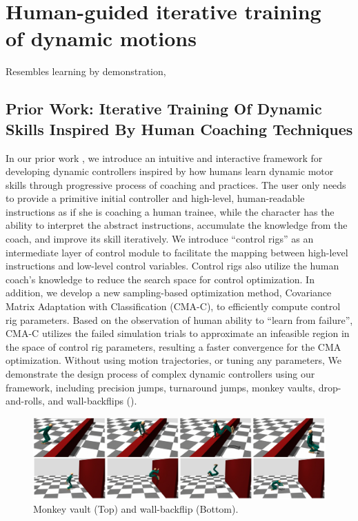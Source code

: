 \chapter{Human-guided iterative training \protect\\ of dynamic motions}
Resembles learning by demonstration,

\section{Prior Work: Iterative Training Of Dynamic Skills Inspired By Human Coaching Techniques}

In our prior work \cite{Ha:2014:ITD},
we introduce an intuitive and interactive framework for developing 
dynamic controllers inspired by how humans learn dynamic motor
skills through progressive process of coaching and practices. 
The user only needs to provide a primitive initial controller and
high-level, human-readable instructions as if
she is coaching a human trainee, while the character has the ability
to interpret the abstract instructions, accumulate the knowledge from
the coach, and improve its skill iteratively. We introduce ``control
rigs'' as an intermediate layer of control module to facilitate the
mapping between high-level instructions and low-level control
variables. Control rigs also utilize the human coach's knowledge to
reduce the search space for control optimization. In addition, we
develop a new sampling-based optimization method, Covariance Matrix
Adaptation with Classification (CMA-C), to efficiently compute control
rig parameters. Based on the observation of human ability to ``learn
from failure'', CMA-C utilizes the failed simulation trials to
approximate an infeasible region in the space of control rig
parameters, resulting a faster convergence for the CMA
optimization. 
Without using motion trajectories, or tuning any parameters,
We demonstrate the design process of complex dynamic
controllers using our framework, including precision jumps, turnaround
jumps, monkey vaults, drop-and-rolls, and wall-backflips 
().


\begin{figure}[htbp]
\center
  \includegraphics[width=\linewidth]{images/training1_teaser}
  \caption{Monkey vault (Top) and wall-backflip (Bottom).}
 \label{fig:training1_teaser}
\end{figure}


